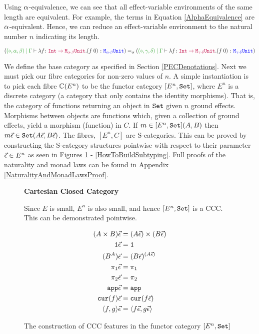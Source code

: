 \documentclass{Report}
\begin{document}
Using $\alpha$-equivalence, we can see that all effect-variable environments of the same length are equivalent. For example, the terms in Equation \ref{AlphaEquivalence} are $\alpha$-equivalent. Hence, we can reduce an effect-variable environment to the natural number $n$ indicating its length.

\begin{equation}\label{AlphaEquivalence}
    \scalebox{.8}{$
    (\etyperelation{(\nil, \a, \b)}{\G}{\lam{f}{\fntype{\texttt{Int}}{\M{\a\dot\b}{\U}}}{(\apply{f}{0})}}{\M{\a\dot\b}{\U}})  =_\a(\etyperelation{(\nil, \g, \d)}{\G}{\lam{f}{\fntype{\texttt{Int}}{\M{\g\dot\d}{\U}}}{(\apply{f}{0})}}{\M{\g\dot\d}{\U}})
    $}
\end{equation}


We define the base category as specified in Section \ref{PECDenotations}. Next we must pick our fibre categories for non-zero values of $n$. A simple instantiation is to pick each fibre $\mathbb{C}(E^n)$ to be the functor category $[E^n, \texttt{Set}]$,  where $E^n$ is a discrete category (a category that only contains the identity morphisms). That is, the category of functions returning an object in $\texttt{Set}$ given $n$ ground effects. Morphisms between objects are functions which, given a collection of ground effects, yield a morphism (function) in $C$. If $m\in [E^n, \texttt{Set}](A, B)$ then $m\vec{\epsilon}\in\texttt{Set}(A\vec{\epsilon}, B\vec{\epsilon})$. The fibres, $[E^n, C]$ are S-categories. This can be proved by constructing the S-category structures pointwise with respect to their parameter $\vec{\epsilon} \in E^n$ as seen in Figures \ref{HowToBuildCCC} - \ref{HowToBuildSubtyping}. Full proofs of the naturality and monad laws can be found in Appendix \ref{NaturalityAndMonadLawsProof}.



\begin{figure}
    
    \begin{framed}
        \centering\textbf{Cartesian Closed Category}

Since $E$ is small, $E^n$ is also small, and hence $[E^n, \texttt{Set}]$ is a CCC. This can be demonstrated pointwise.

\begin{align*}
    (A\times B)\vec{\epsilon} & = (A\vec{\epsilon})\times(B\vec{\epsilon})\\
    \texttt{1}\vec{\epsilon} & = \texttt{1}\\
    (B^A)\vec{\epsilon} &= (B\vec{\epsilon})^{(A\vec{\epsilon})}\\
    \pi_1\vec{\epsilon} & = \pi_1\\
    \pi_2\vec{\epsilon} & = \pi_2\\
    \texttt{app}\vec{\epsilon} & = \texttt{app}\\
    \texttt{cur}(f)\vec{\epsilon} & = \texttt{cur}(f\vec{\epsilon})\\
    \langle f, g\rangle\vec{\epsilon} & = \langle f\vec{\epsilon}, g\vec{\epsilon}\rangle\\
\end{align*}

\end{framed}
\caption{The construction of CCC features in the functor category $[E^n, \texttt{Set}]$}
\label{HowToBuildCCC}
\end{figure}
\end{document}
